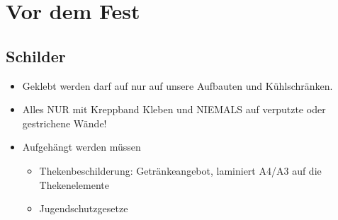 \section{Vor dem Fest}
\subsection{Schilder}
\begin{itemize}
  \item Geklebt werden darf auf nur auf unsere Aufbauten und Kühlschränken.
  \item Alles NUR mit Kreppband Kleben und NIEMALS auf verputzte oder gestrichene Wände!
  \item Aufgehängt werden müssen
    \begin{itemize}
      \item Thekenbeschilderung: Getränkeangebot, laminiert A4/A3 auf die Thekenelemente
      \item Jugendschutzgesetze
    \end{itemize}
\end{itemize}
